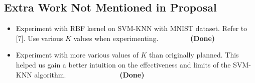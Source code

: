 \documentclass[11pt,letterpaper]{article}
\begin{document}
\subsection{Extra Work Not Mentioned in Proposal}

\begin{itemize}
\item Experiment with RBF kernel on SVM-KNN with MNIST dataset. Refer to [7]. Use various $K$ values when experimenting. $\>\>\>\>\>\>\>\>\>\>\>\>\>\>\>\>\>\>\>$\textbf{(Done)}

\item Experiment with more various values of $K$ than originally planned. This helped us gain a better intuition on the effectiveness and limits of the SVM-KNN algorithm. $\>\>\>\>\>\>\>\>\>\>\>\>\>\>\>\>\>\>\>\>\>\>\>\>\>\>\>\>\>\>\>\>\>$\textbf{(Done)}

\end{itemize}

\newpage
\end{document}
